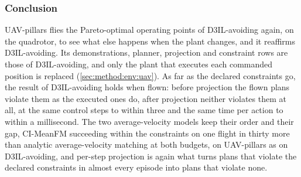 \FloatBarrier
\subsubsection{Conclusion}\label{sec:res:uav:pillars:conclusion}

UAV-pillars flies the Pareto-optimal operating points of D3IL-avoiding again, on the quadrotor, to see what
else happens when the plant changes, and it reaffirms D3IL-avoiding. Its demonstrations, planner, projection
and constraint rows are those of D3IL-avoiding, and only the plant that executes each commanded position is
replaced (\autoref{sec:method:env:uav}). As far as the declared constraints go, the result of D3IL-avoiding holds when
flown: before projection the flown plans violate them as the executed ones do, after projection neither
violates them at all, at the same control steps to within three and the same time per action to within a
millisecond. The two average-velocity models keep their order and their gap, CI-MeanFM succeeding within the
constraints on one flight in thirty more than analytic average-velocity matching at both budgets, on
UAV-pillars as on D3IL-avoiding, and per-step projection is again what turns plans that violate the declared
constraints in almost every episode into plans that violate none.

